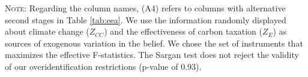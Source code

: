 \documentclass[12pt]{article} %
\begin{document}
\begin{table}[!htbp] \centering 
  \caption{First-stage regressions results for environmental effectiveness} 
  \label{first_stage_environmental_effectiveness} 
 {\footnotesize  \parbox[t]{.8\textwidth}{\linespread{1.2}\selectfont \textsc{Note:} Regarding the column names, (A4) refers to columns with alternative second stages in Table \ref{tab:eea}. We use the information randomly displayed about climate change ($Z_{CC}$) and the effectiveness of carbon taxation ($Z_{E}$) as sources of exogenous variation in the belief. We chose the set of instruments that maximizes the effective F-statistics. The Sargan test does not reject the validity of our overidentification restrictions (p-value of 0.93).}} %
\end{table}

\end{document}
